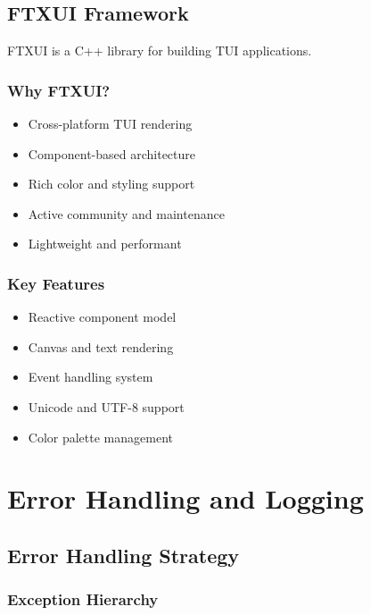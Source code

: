 \documentclass[12pt,a4paper,oneside,openany]{report}
\begin{document}
\section{FTXUI Framework}

FTXUI is a C++ library for building TUI applications.

\subsection{Why FTXUI?}

\begin{itemize}
	\item Cross-platform TUI rendering
	\item Component-based architecture
	\item Rich color and styling support
	\item Active community and maintenance
	\item Lightweight and performant
\end{itemize}

\subsection{Key Features}

\begin{itemize}
	\item Reactive component model
	\item Canvas and text rendering
	\item Event handling system
	\item Unicode and UTF-8 support
	\item Color palette management
\end{itemize}

\chapter{Error Handling and Logging}

\section{Error Handling Strategy}

\subsection{Exception Hierarchy}
\end{document}
